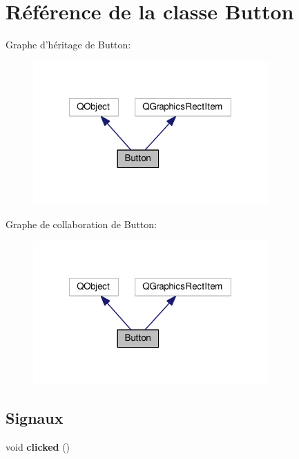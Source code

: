 \hypertarget{classButton}{\section{Référence de la classe Button}
\label{classButton}
}


Graphe d'héritage de Button\+:
\nopagebreak
\begin{figure}[H]
\begin{center}
\leavevmode
\includegraphics[width=255pt]{d5/dbb/classButton__inherit__graph}
\end{center}
\end{figure}


Graphe de collaboration de Button\+:
\nopagebreak
\begin{figure}[H]
\begin{center}
\leavevmode
\includegraphics[width=255pt]{d6/dbf/classButton__coll__graph}
\end{center}
\end{figure}
\subsection*{Signaux}
\begin{DoxyCompactItemize}
\item 
\hypertarget{classButton_a9e7ab4152cb1e7e3beb7f2842f32670c}{void {\bfseries clicked} ()}\label{classButton_a9e7ab4152cb1e7e3beb7f2842f32670c}

\end{DoxyCompactItemize}
